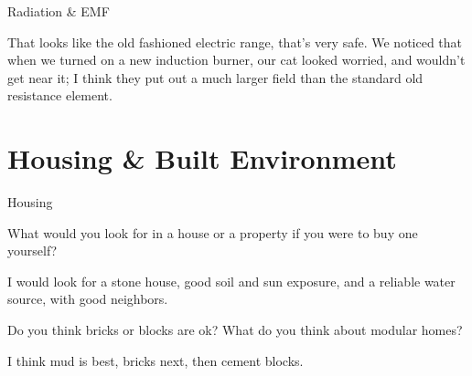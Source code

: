 \documentclass[11pt,oneside,openany,extrafontsizes]{memoir}
\begin{document}
\begin{standalonequote}{Radiation \& EMF}

    \begin{answer}
      That looks like the old fashioned electric range, that's very safe. We noticed that when we turned on a new induction burner, our cat looked worried, and wouldn't get near it; I think they put out a much larger field than the standard old resistance element.
    \end{answer}
\end{standalonequote}

\section{Housing \& Built Environment}

\begin{emailexchange}{Housing}

    \begin{question}
        What would you look for in a house or a property if you were to buy one yourself?
    \end{question}

    \begin{answer}
       I would look for a stone house, good soil and sun exposure, and a reliable water source, with good neighbors.
    \end{answer}
	
    \begin{question}
        Do you think bricks or blocks are ok? What do you think about modular homes?
    \end{question}

    \begin{answer}
      I think mud is best, bricks next, then cement blocks.
    \end{answer}
\end{emailexchange}
\end{document}
